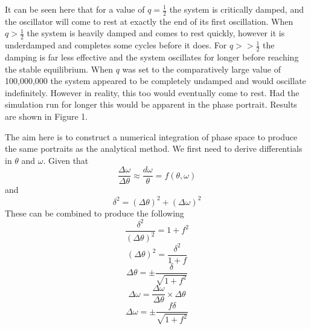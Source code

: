 \documentclass[12pt]{article}
\newenvironment{problem}[2][Problem]{\begin{trivlist}
\item[\hskip \labelsep {\bfseries #1}\hskip \labelsep {\bfseries #2.}]}{\end{trivlist}}
\begin{document}
\begin{problem}{3}

It can be seen here that for a value of $q = \frac{1}{2}$ the system is critically damped, and the oscillator will come to rest at exactly the end of its first oscillation. When $q > \frac{1}{2}$ the system is heavily damped and comes to rest quickly, however it is underdamped and completes some cycles before it does. For $q >> \frac{1}{2}$ the damping is far less effective and the system oscillates for longer before reaching the stable equilibrium. When $q$ was set to the comparatively large value of  100,000,000 the system appeared to be completely undamped and would oscillate indefinitely. However in reality, this too would eventually come to rest. Had the simulation run for longer this would be apparent in the phase portrait. Results are shown in Figure 1.





\end{problem}


\begin{problem}{4}
The aim here is to construct a numerical integration of phase space to produce the same portraits as the analytical method. We first need to derive differentials in $\theta$ and $\omega$. Given that 
\[\frac{\Delta\omega}{\Delta\theta}\approx \frac{d\omega}{\theta} = f(\theta, \omega)\] and
\[\delta^2 = (\Delta\theta)^2 + (\Delta\omega)^2\]
These can be combined to produce the following 
\[\frac{\delta^2}{(\Delta\theta)^2} = 1 + f^2\]
\[(\Delta\theta)^2 = \frac{\delta^2}{1+f}\]
\begin{equation}
\Delta\theta = \pm\frac{\delta}{\sqrt{1+f^2}}
\end{equation}
\[\Delta\omega = \frac{\Delta\omega}{\Delta\theta} \times \Delta\theta\]
\begin{equation}
    \Delta\omega = \pm \frac{f\delta}{\sqrt{1+f^2}}
\end{equation}

\end{problem}
\end{document}
